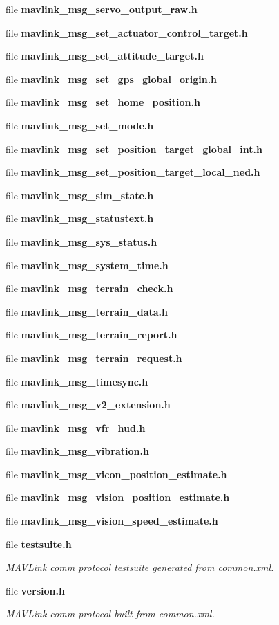 \begin{DoxyCompactItemize}
\item 
file \textbf{ mavlink\+\_\+msg\+\_\+servo\+\_\+output\+\_\+raw.\+h}
\item 
file \textbf{ mavlink\+\_\+msg\+\_\+set\+\_\+actuator\+\_\+control\+\_\+target.\+h}
\item 
file \textbf{ mavlink\+\_\+msg\+\_\+set\+\_\+attitude\+\_\+target.\+h}
\item 
file \textbf{ mavlink\+\_\+msg\+\_\+set\+\_\+gps\+\_\+global\+\_\+origin.\+h}
\item 
file \textbf{ mavlink\+\_\+msg\+\_\+set\+\_\+home\+\_\+position.\+h}
\item 
file \textbf{ mavlink\+\_\+msg\+\_\+set\+\_\+mode.\+h}
\item 
file \textbf{ mavlink\+\_\+msg\+\_\+set\+\_\+position\+\_\+target\+\_\+global\+\_\+int.\+h}
\item 
file \textbf{ mavlink\+\_\+msg\+\_\+set\+\_\+position\+\_\+target\+\_\+local\+\_\+ned.\+h}
\item 
file \textbf{ mavlink\+\_\+msg\+\_\+sim\+\_\+state.\+h}
\item 
file \textbf{ mavlink\+\_\+msg\+\_\+statustext.\+h}
\item 
file \textbf{ mavlink\+\_\+msg\+\_\+sys\+\_\+status.\+h}
\item 
file \textbf{ mavlink\+\_\+msg\+\_\+system\+\_\+time.\+h}
\item 
file \textbf{ mavlink\+\_\+msg\+\_\+terrain\+\_\+check.\+h}
\item 
file \textbf{ mavlink\+\_\+msg\+\_\+terrain\+\_\+data.\+h}
\item 
file \textbf{ mavlink\+\_\+msg\+\_\+terrain\+\_\+report.\+h}
\item 
file \textbf{ mavlink\+\_\+msg\+\_\+terrain\+\_\+request.\+h}
\item 
file \textbf{ mavlink\+\_\+msg\+\_\+timesync.\+h}
\item 
file \textbf{ mavlink\+\_\+msg\+\_\+v2\+\_\+extension.\+h}
\item 
file \textbf{ mavlink\+\_\+msg\+\_\+vfr\+\_\+hud.\+h}
\item 
file \textbf{ mavlink\+\_\+msg\+\_\+vibration.\+h}
\item 
file \textbf{ mavlink\+\_\+msg\+\_\+vicon\+\_\+position\+\_\+estimate.\+h}
\item 
file \textbf{ mavlink\+\_\+msg\+\_\+vision\+\_\+position\+\_\+estimate.\+h}
\item 
file \textbf{ mavlink\+\_\+msg\+\_\+vision\+\_\+speed\+\_\+estimate.\+h}
\item 
file \textbf{ testsuite.\+h}
\begin{DoxyCompactList}\small\item\em M\+A\+V\+Link comm protocol testsuite generated from common.\+xml. \end{DoxyCompactList}\item 
file \textbf{ version.\+h}
\begin{DoxyCompactList}\small\item\em M\+A\+V\+Link comm protocol built from common.\+xml. \end{DoxyCompactList}\end{DoxyCompactItemize}

